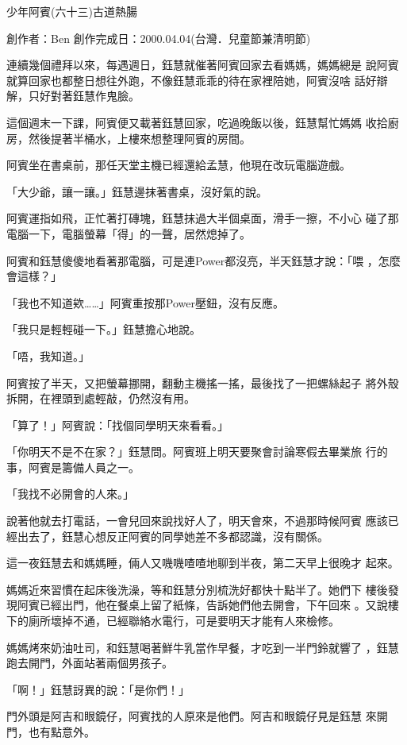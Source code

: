 



少年阿賓(六十三)古道熱腸


創作者：Ben
創作完成日：2000.04.04(台灣．兒童節兼清明節)

連續幾個禮拜以來，每遇週日，鈺慧就催著阿賓回家去看媽媽，媽媽總是
說阿賓就算回家也都整日想往外跑，不像鈺慧乖乖的待在家裡陪她，阿賓沒啥
話好辯解，只好對著鈺慧作鬼臉。

這個週末一下課，阿賓便又載著鈺慧回家，吃過晚飯以後，鈺慧幫忙媽媽
收拾廚房，然後提著半桶水，上樓來想整理阿賓的房間。

阿賓坐在書桌前，那任天堂主機已經還給孟慧，他現在改玩電腦遊戲。

「大少爺，讓一讓。」鈺慧邊抹著書桌，沒好氣的說。

阿賓運指如飛，正忙著打磚塊，鈺慧抹過大半個桌面，滑手一擦，不小心
碰了那電腦一下，電腦螢幕「得」的一聲，居然熄掉了。

阿賓和鈺慧傻傻地看著那電腦，可是連Power都沒亮，半天鈺慧才說：「喂
，怎麼會這樣？」

「我也不知道欸……」阿賓重按那Power壓鈕，沒有反應。

「我只是輕輕碰一下。」鈺慧擔心地說。

「唔，我知道。」

阿賓按了半天，又把螢幕挪開，翻動主機搖一搖，最後找了一把螺絲起子
將外殼拆開，在裡頭到處輕敲，仍然沒有用。

「算了！」阿賓說：「找個同學明天來看看。」

「你明天不是不在家？」鈺慧問。阿賓班上明天要聚會討論寒假去畢業旅
行的事，阿賓是籌備人員之一。

「我找不必開會的人來。」

說著他就去打電話，一會兒回來說找好人了，明天會來，不過那時候阿賓
應該已經出去了，鈺慧心想反正阿賓的同學她差不多都認識，沒有關係。

這一夜鈺慧去和媽媽睡，倆人又嘰嘰喳喳地聊到半夜，第二天早上很晚才
起來。

媽媽近來習慣在起床後洗澡，等和鈺慧分別梳洗好都快十點半了。她們下
樓後發現阿賓已經出門，他在餐桌上留了紙條，告訴她們他去開會，下午回來
。又說樓下的廁所壞掉不通，已經聯絡水電行，可是要明天才能有人來檢修。

媽媽烤來奶油吐司，和鈺慧喝著鮮牛乳當作早餐，才吃到一半門鈴就響了
，鈺慧跑去開門，外面站著兩個男孩子。

「啊！」鈺慧訝異的說：「是你們！」

門外頭是阿吉和眼鏡仔，阿賓找的人原來是他們。阿吉和眼鏡仔見是鈺慧
來開門，也有點意外。

